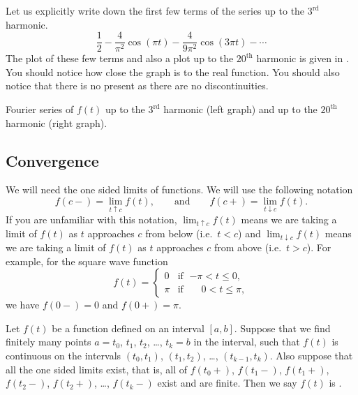 \begin{example}
Let us explicitly write down the first few terms of the series
up to the $3^{\text{rd}}$ harmonic.
\begin{equation*}
\frac{1}{2} -
\frac{4}{\pi^2} \cos (\pi t)
-
\frac{4}{9 \pi^2} \cos (3 \pi t)
- \cdots
\end{equation*}
The plot of these few terms and also a plot up to the ${20}^{\text{th}}$
harmonic is given in
.  You should notice how close the graph is
to the real function.  You should also notice that there is no
 present as there are no discontinuities.

\begin{myfig}
\capstart
\caption{Fourier series of $f(t)$ up to the $3^{\text{rd}}$ harmonic (left
graph)
and up to the ${20}^{\text{th}}$ harmonic (right graph).\label{gfs:sawcontfsfig}}
\end{myfig}
\end{example}

\subsection{Convergence}

We will need the one sided limits of functions.
We will use the following notation
\begin{equation*}
f(c-) = \lim_{t \uparrow c} f(t),
\qquad \text{and} \qquad
f(c+) = \lim_{t \downarrow c} f(t).
\end{equation*}
If you are unfamiliar with this notation,
$\lim_{t \uparrow c} f(t)$ means we are taking a limit of $f(t)$
as $t$ approaches $c$ from below (i.e.\ $t < c$) and
$\lim_{t \downarrow c} f(t)$ means we are taking a limit of $f(t)$
as $t$ approaches $c$ from above (i.e.\ $t > c$).
For example, for the square wave function
\begin{equation} \label{gfs:sqwaveeq}
f(t) =
\begin{cases}
0 & \text{if } \; {-\pi} < t \leq 0 , \\
\pi & \text{if } \; \phantom{-}0 < t \leq \pi ,
\end{cases}
\end{equation}
we have $f(0-) = 0$ and $f(0+) = \pi$.

Let $f(t)$ be a function defined on an interval $[a,b]$.  Suppose
that we find finitely many points
$a=t_0$, $t_1$, $t_2$, \ldots, $t_k=b$ in
the interval, such that $f(t)$ is continuous
on the intervals
$(t_0,t_1)$, 
$(t_1,t_2)$, \ldots, 
$(t_{k-1},t_k)$.
Also suppose that all the one sided limits exist, that is,
all of
$f(t_0+)$,
$f(t_1-)$,
$f(t_1+)$,
$f(t_2-)$,
$f(t_2+)$,
\ldots,
$f(t_k-)$
exist and are finite.
Then
we say $f(t)$ is \emph{}.

